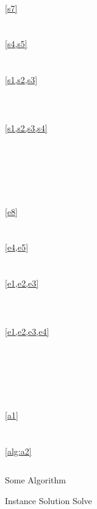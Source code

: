 \documentclass{article}
\begin{document}
\tableofcontents

~\\
\cref{s7}\\
\\
\\
\cref{s4,s5}\\
\\
\\
\cref{s1,s2,s3}\\
\\
\\
\\
\cref{s1,s2,s3,s4}\\
\\
\\
\\
\\
\\
\\
\cref{e8}\\
\\
\\
\cref{e4,e5}\\
\\
\\
\cref{e1,e2,e3}\\
\\
\\
\\
\cref{e1,e2,e3,e4}\\
\\
\\
\\
\\
\\
\\
\cref{a1}\\
\\
\\

\ref{alg:a2}

\label{s1}



\begin{equation}
\label{e1}
\end{equation}

\begin{algorithm}
	\caption{Some Algorithm}{\label{a1}}
	\begin{algorithmic}[1]
		\REQUIRE Instance
		\ENSURE Solution
        \STATE Solve
	\end{algorithmic}
\end{algorithm}
\end{document}
